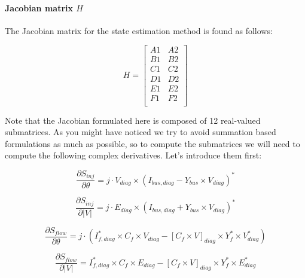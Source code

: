 \documentclass[a4paper,twoside,fleqn]{tufte-book}
\begin{document}
\paragraph{Jacobian matrix $H$}

The Jacobian matrix for the state estimation method is found as follows:

\begin{equation}
H=
\left[
\begin{array}{cc}
A1 &
A2 \\
B1 &
B2 \\
C1 &
C2 \\
D1 &
D2 \\
E1 &
E2 \\
F1 &
F2 \\
\end{array}
\right]
\label{SE_jacobian}
\end{equation}

Note that the Jacobian formulated here is composed of 12 real-valued submatrices. As you might have noticed we try to avoid summation based formulations as much as possible, so to compute the submatrices we will need to compute the following complex derivatives. Let's introduce them first:


\begin{equation}
\frac{\partial S_{inj}}{\partial \theta} = j \cdot V_{diag} \times (I_{bus,diag}-Y_{bus} \times V_{diag}  )^* 
\end{equation}


\begin{equation}\frac{\partial S_{inj}}{\partial |V|}=j \cdot E_{diag} \times (I_{bus,diag} + Y_{bus} \times V_{diag}  )^* \end{equation}

\begin{equation}\frac{\partial S_{flow}}{\partial \theta} = j \cdot (I_{f,diag}^* \times C_f \times V_{diag} - [C_f \times V]_{diag} \times Y_f^* \times V_{diag}^* ) 
\end{equation}

\begin{equation}\frac{\partial S_{flow}}{\partial |V|}=I_{f,diag}^* \times C_f \times E_{diag}- [C_f \times V]_{diag} \times Y_f^* \times E_{diag}^* 
\end{equation}

\end{document}

